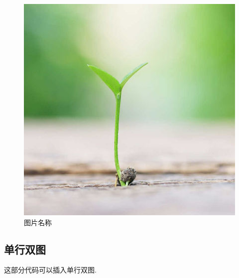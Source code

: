 \documentclass[12pt, a4paper, oneside]{ctexart}
\begin{document}
	\begin{figure}[H]
		\centering								%
		\includegraphics[scale=1.0]{LaTeX_article_template.jpg}		%
		\caption{图片名称}						%
	\end{figure}

\subsection{单行双图}
	这部分代码可以插入单行双图.
\end{document}
